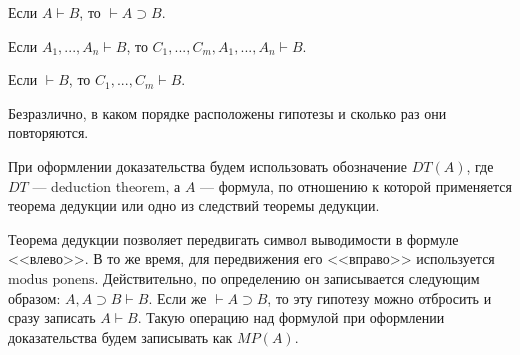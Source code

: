 \begin{consequence}
    Если $A \vdash B$, то $\vdash A \supset B$.
\end{consequence}

\begin{consequence}
    Если $A_1,...,A_n \vdash B$, то $C_1,...,C_m, A_1,...,A_n \vdash B$.
\end{consequence}

\begin{consequence}
    Если $\vdash B$, то $C_1,...,C_m \vdash B$.
\end{consequence}

\begin{consequence}
    Безразлично, в каком порядке расположены гипотезы и сколько раз они повторяются.
\end{consequence}

\begin{remark}
    При оформлении доказательства будем использовать обозначение $DT(A)$, где $DT$ --- deduction theorem, а $A$ --- формула, по отношению к которой применяется теорема дедукции или одно из следствий теоремы дедукции.
\end{remark}

\begin{remark}
    Теорема дедукции позволяет передвигать символ выводимости в формуле <<влево>>. В то же время, для передвижения его <<вправо>> используется $\text{modus ponens}$. Действительно, по определению он записывается следующим образом: $A, A \supset B \vdash B$. Если же $\vdash A \supset B$, то эту гипотезу можно отбросить и сразу записать $A \vdash B$. Такую операцию над формулой при оформлении доказательства будем записывать как $MP(A)$.
\end{remark}
